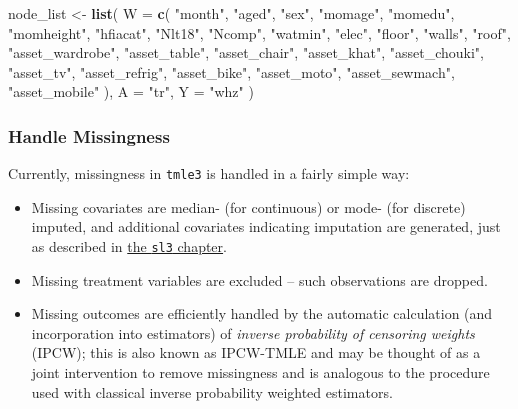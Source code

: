 \documentclass[12pt, krantz2,]{krantz}
\newenvironment{Shaded}{\begin{snugshade}}{\end{snugshade}}
\newcommand{\DataTypeTok}[1]{\textcolor[rgb]{0.27,0.27,0.27}{#1}}
\newcommand{\KeywordTok}[1]{\textcolor[rgb]{0.27,0.27,0.27}{\textbf{#1}}}
\newcommand{\NormalTok}[1]{#1}
\newcommand{\StringTok}[1]{\textcolor[rgb]{0.5,0.5,0.5}{#1}}
\providecommand{\tightlist}{%
  \setlength{\itemsep}{0pt}\setlength{\parskip}{0pt}}
\theoremstyle{definition}
\theoremstyle{definition}
\theoremstyle{definition}
\newcommand{\1}{\mathbbm{1}}
\begin{document}
\begin{Shaded}
\begin{Highlighting}[]
\NormalTok{node_list <-}\StringTok{ }\KeywordTok{list}\NormalTok{(}
  \DataTypeTok{W =} \KeywordTok{c}\NormalTok{(}
    \StringTok{"month"}\NormalTok{, }\StringTok{"aged"}\NormalTok{, }\StringTok{"sex"}\NormalTok{, }\StringTok{"momage"}\NormalTok{, }\StringTok{"momedu"}\NormalTok{,}
    \StringTok{"momheight"}\NormalTok{, }\StringTok{"hfiacat"}\NormalTok{, }\StringTok{"Nlt18"}\NormalTok{, }\StringTok{"Ncomp"}\NormalTok{, }\StringTok{"watmin"}\NormalTok{,}
    \StringTok{"elec"}\NormalTok{, }\StringTok{"floor"}\NormalTok{, }\StringTok{"walls"}\NormalTok{, }\StringTok{"roof"}\NormalTok{, }\StringTok{"asset_wardrobe"}\NormalTok{,}
    \StringTok{"asset_table"}\NormalTok{, }\StringTok{"asset_chair"}\NormalTok{, }\StringTok{"asset_khat"}\NormalTok{,}
    \StringTok{"asset_chouki"}\NormalTok{, }\StringTok{"asset_tv"}\NormalTok{, }\StringTok{"asset_refrig"}\NormalTok{,}
    \StringTok{"asset_bike"}\NormalTok{, }\StringTok{"asset_moto"}\NormalTok{, }\StringTok{"asset_sewmach"}\NormalTok{,}
    \StringTok{"asset_mobile"}
\NormalTok{  ),}
  \DataTypeTok{A =} \StringTok{"tr"}\NormalTok{,}
  \DataTypeTok{Y =} \StringTok{"whz"}
\NormalTok{)}
\end{Highlighting}
\end{Shaded}

\hypertarget{handle-missingness}{%
\subsubsection{Handle Missingness}\label{handle-missingness}}

Currently, missingness in \texttt{tmle3} is handled in a fairly simple way:

\begin{itemize}
\tightlist
\item
  Missing covariates are median- (for continuous) or mode- (for discrete)
  imputed, and additional covariates indicating imputation are generated, just
  as described in \protect\hyperlink{sl3}{the \texttt{sl3} chapter}.
\item
  Missing treatment variables are excluded -- such observations are dropped.
\item
  Missing outcomes are efficiently handled by the automatic calculation (and
  incorporation into estimators) of \emph{inverse probability of censoring weights}
  (IPCW); this is also known as IPCW-TMLE and may be thought of as a joint
  intervention to remove missingness and is analogous to the procedure used with
  classical inverse probability weighted estimators.
\end{itemize}
\end{document}
